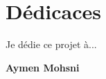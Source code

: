 
\chapter*{Dédicaces }

\begin{center}

	\begin{minipage}[c]{1\columnwidth}

		{\large
			\vskip1cm

			\centering
			Je dédie ce projet à...
		}


	\end{minipage}

\end{center}

\vskip1.5cm
\begin{flushright}\LARGE
	\bf{Aymen Mohsni}
\end{flushright}







